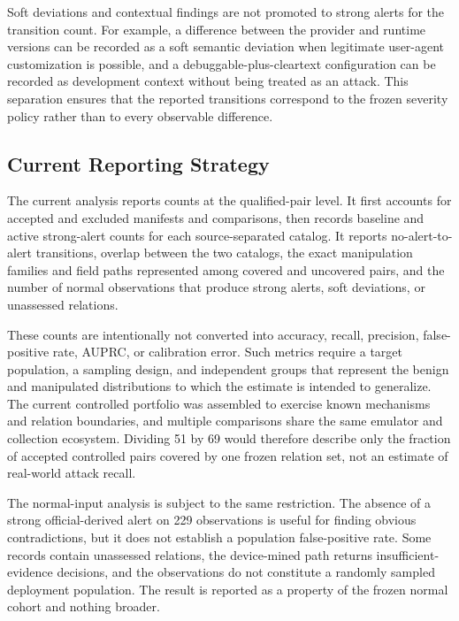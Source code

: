 Soft deviations and contextual findings are not promoted to strong alerts for the transition count. For example, a difference between the provider and runtime versions can be recorded as a soft semantic deviation when legitimate user-agent customization is possible, and a debuggable-plus-cleartext configuration can be recorded as development context without being treated as an attack. This separation ensures that the reported transitions correspond to the frozen severity policy rather than to every observable difference.

\subsection{Current Reporting Strategy}

The current analysis reports counts at the qualified-pair level. It first accounts for accepted and excluded manifests and comparisons, then records baseline and active strong-alert counts for each source-separated catalog. It reports no-alert-to-alert transitions, overlap between the two catalogs, the exact manipulation families and field paths represented among covered and uncovered pairs, and the number of normal observations that produce strong alerts, soft deviations, or unassessed relations.

These counts are intentionally not converted into accuracy, recall, precision, false-positive rate, AUPRC, or calibration error. Such metrics require a target population, a sampling design, and independent groups that represent the benign and manipulated distributions to which the estimate is intended to generalize. The current controlled portfolio was assembled to exercise known mechanisms and relation boundaries, and multiple comparisons share the same emulator and collection ecosystem. Dividing 51 by 69 would therefore describe only the fraction of accepted controlled pairs covered by one frozen relation set, not an estimate of real-world attack recall.

The normal-input analysis is subject to the same restriction. The absence of a strong official-derived alert on 229 observations is useful for finding obvious contradictions, but it does not establish a population false-positive rate. Some records contain unassessed relations, the device-mined path returns insufficient-evidence decisions, and the observations do not constitute a randomly sampled deployment population. The result is reported as a property of the frozen normal cohort and nothing broader.

